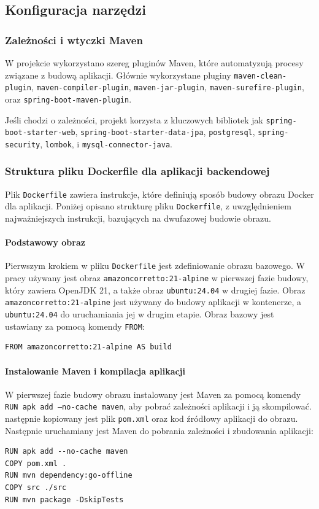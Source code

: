\subsection{Konfiguracja narzędzi} 

\subsubsection{Zależności i wtyczki Maven}
W projekcie wykorzystano szereg pluginów Maven, które automatyzują procesy związane z budową aplikacji. Głównie wykorzystane pluginy \texttt{maven-clean-plugin}, \texttt{maven-compiler-plugin}, \texttt{maven-jar-plugin}, \texttt{maven-surefire-plugin}, oraz \texttt{spring-boot-maven-plugin}.

Jeśli chodzi o zależności, projekt korzysta z kluczowych bibliotek jak \texttt{spring-boot-starter-web}, \texttt{spring-boot-starter-data-jpa}, \texttt{postgresql}, \texttt{spring-security}, \texttt{lombok}, i \texttt{mysql-connector-java}.

\subsubsection{Struktura pliku Dockerfile dla aplikacji backendowej}

Plik \texttt{Dockerfile} zawiera instrukcje, które definiują sposób budowy obrazu Docker dla aplikacji. Poniżej opisano strukturę pliku \texttt{Dockerfile}, z uwzględnieniem najważniejszych instrukcji, bazujących na dwufazowej budowie obrazu.

\paragraph{Podstawowy obraz}
Pierwszym krokiem w pliku \texttt{Dockerfile} jest zdefiniowanie obrazu bazowego. W pracy używany jest obraz \texttt{amazoncorretto:21-alpine} w pierwszej fazie budowy, który zawiera OpenJDK 21, a także obraz \texttt{ubuntu:24.04} w drugiej fazie. Obraz \texttt{amazoncorretto:21-alpine} jest używany do budowy aplikacji w kontenerze, a \texttt{ubuntu:24.04} do uruchamiania jej w drugim etapie. Obraz bazowy jest ustawiany za pomocą komendy \texttt{FROM}:
\begin{lstlisting}[basicstyle=\footnotesize\ttfamily]
FROM amazoncorretto:21-alpine AS build
\end{lstlisting}

\paragraph{Instalowanie Maven i kompilacja aplikacji}
W pierwszej fazie budowy obrazu instalowany jest Maven za pomocą komendy \texttt{RUN apk add --no-cache maven}, aby pobrać zależności aplikacji i ją skompilować. następnie kopiowany jest plik \texttt{pom.xml} oraz kod źródłowy aplikacji do obrazu. Następnie uruchamiany jest Maven do pobrania zależności i zbudowania aplikacji:
\begin{lstlisting}[basicstyle=\footnotesize\ttfamily]
RUN apk add --no-cache maven
COPY pom.xml .
RUN mvn dependency:go-offline
COPY src ./src
RUN mvn package -DskipTests
\end{lstlisting}

